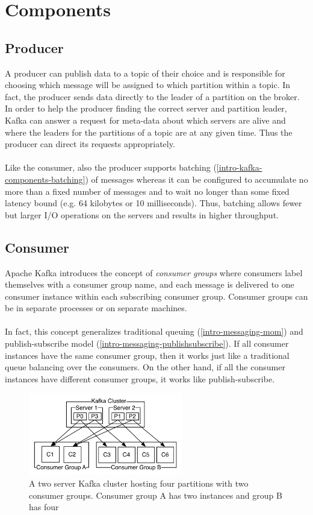 \section{Components}

\subsection{Producer}

A producer can publish data to a topic of their choice and is responsible for
choosing which message will be assigned to which partition within a topic. In
fact, the producer sends data directly to the leader of a partition on the
broker. In order to help the producer finding the correct server and partition
leader, Kafka can answer a request for meta-data about which servers are alive
and where the leaders for the partitions of a topic are at any given time. Thus
the producer can direct its requests appropriately.
\\ \\
Like the consumer, also the producer supports batching
(\ref{intro-kafka-components-batching}) of messages whereas it can be configured
to accumulate no more than a fixed number of messages and to wait no longer than
some fixed latency bound (e.g. 64 kilobytes or 10 milliseconds). Thus, batching
allows fewer but larger I/O operations on the servers and results in higher
throughput. 

\subsection{Consumer}

Apache Kafka introduces the concept of \textit{consumer groups} where consumers
label themselves with a consumer group name, and each message is delivered to
one consumer instance within each subscribing consumer group. Consumer groups
can be in separate processes or on separate machines.
\\ \\
In fact, this concept generalizes traditional queuing (\ref{intro-messaging-mom})
and publish-subscribe model (\ref{intro-messaging-publishsubscribe}).
If all consumer instances have the same consumer
group, then it works just like a traditional queue balancing over the consumers.
On the other hand, if all the consumer instances have different consumer groups,
it works like publish-subscribe.

\begin{figure}[H]
    \centering
    \includegraphics[width=0.6\textwidth]{images/consumer-groups.png}
    \caption{A two server Kafka cluster hosting four partitions with two consumer groups. Consumer group A has two instances and group B has four \cite{apachekafka}}
    \label{fig:the-log}
\end{figure}

